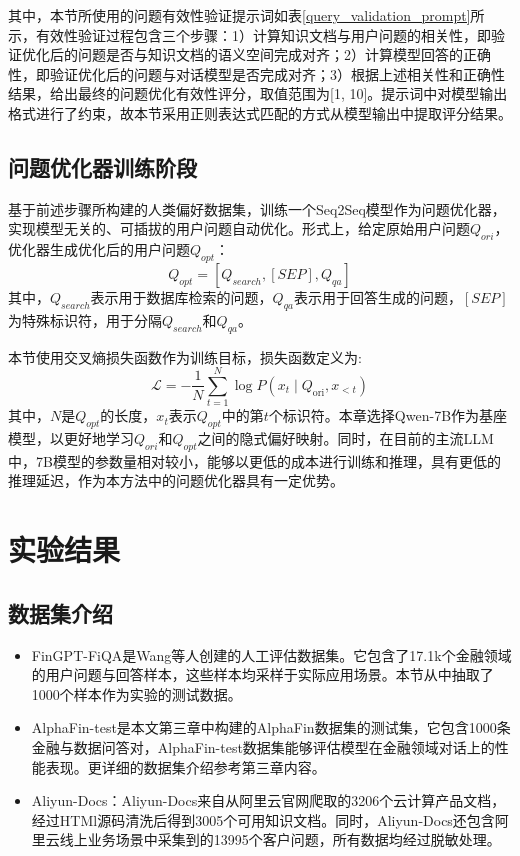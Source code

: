 其中，本节所使用的问题有效性验证提示词如表\ref{query_validation_prompt}所示，有效性验证过程包含三个步骤：1）计算知识文档与用户问题的相关性，即验证优化后的问题是否与知识文档的语义空间完成对齐；2）计算模型回答的正确性，即验证优化后的问题与对话模型是否完成对齐；3）根据上述相关性和正确性结果，给出最终的问题优化有效性评分，取值范围为[1, 10]。提示词中对模型输出格式进行了约束，故本节采用正则表达式匹配的方式从模型输出中提取评分结果。

\subsection{问题优化器训练阶段}

基于前述步骤所构建的人类偏好数据集，训练一个Seq2Seq\cite{DBLP:journals/corr/abs-2309-16609}模型作为问题优化器，实现模型无关的、可插拔的用户问题自动优化。形式上，给定原始用户问题$Q_{ori}$，优化器生成优化后的用户问题$Q_{opt}$：
\begin{equation}
	Q_{opt} = [Q_{search}, [SEP], Q_{qa}]
\end{equation}
其中，$Q_{search}$表示用于数据库检索的问题，$Q_{qa}$表示用于回答生成的问题，$[SEP]$为特殊标识符，用于分隔$Q_{search}$和$Q_{qa}$。

本节使用交叉熵损失函数作为训练目标，损失函数定义为:
\begin{equation}
	\mathcal{L}=-\frac{1}{N} \sum_{t=1}^N \log P\left(x_t \mid Q_{\text{ori}}, x_{<t}\right)
\end{equation}
其中，$N$是$Q_{opt}$的长度，$x_t$表示$Q_{opt}$中的第$t$个标识符。本章选择Qwen-7B作为基座模型，以更好地学习$Q_{ori}$和$Q_{opt}$之间的隐式偏好映射。同时，在目前的主流LLM中，7B模型的参数量相对较小，能够以更低的成本进行训练和推理，具有更低的推理延迟，作为本方法中的问题优化器具有一定优势。

\section{实验结果}

\subsection{数据集介绍}

\begin{itemize}[topsep = 0 pt, itemsep= 0 pt, parsep=0pt, partopsep=0pt, leftmargin=36pt, itemindent=0pt, labelsep=6pt, listparindent=24pt]
	\item FinGPT-FiQA\cite{wang2023fingptbenchmark}是Wang等人创建的人工评估数据集。它包含了17.1k个金融领域的用户问题与回答样本，这些样本均采样于实际应用场景。本节从中抽取了1000个样本作为实验的测试数据。
	\item AlphaFin-test是本文第三章中构建的AlphaFin数据集的测试集，它包含1000条金融与数据问答对，AlphaFin-test数据集能够评估模型在金融领域对话上的性能表现。更详细的数据集介绍参考第三章内容。	
	\item Aliyun-Docs：Aliyun-Docs来自从阿里云官网爬取的3206个云计算产品文档，经过HTMl源码清洗后得到3005个可用知识文档。同时，Aliyun-Docs还包含阿里云线上业务场景中采集到的13995个客户问题，所有数据均经过脱敏处理。
\end{itemize}

